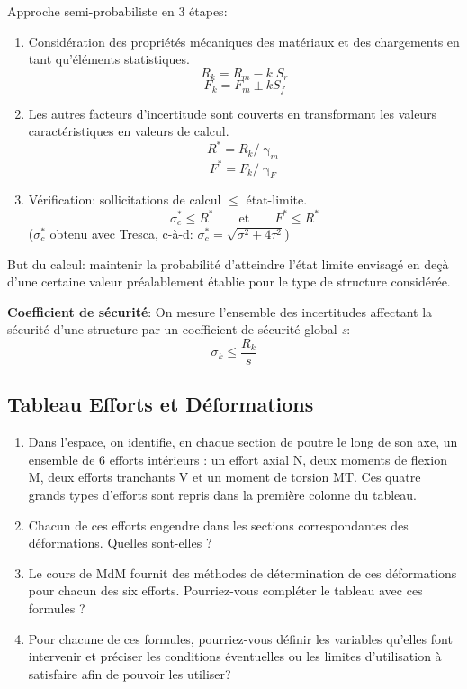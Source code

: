 \documentclass[a4paper]{article}
\begin{document}
Approche semi-probabiliste en 3 étapes:
\begin{enumerate}[label=(\alph*)]

\item Considération des propriétés mécaniques des matériaux et des chargements en tant qu'éléments statistiques.
\[ R_k = R_m - k \; S_r \]
\[ F_k = F_m \pm k S_f \]

\item Les autres facteurs d'incertitude sont couverts en transformant les valeurs caractéristiques en valeurs de calcul.
\[ R^* = R_k / \upgamma_m \]
\[ F^* = F_k / \upgamma_F \]

\item Vérification: sollicitations de calcul $ \leq $ état-limite.
\[ \sigma_c^* \leq R^* \qquad \text{et} \qquad F^* \leq R^* \]
($ \sigma_c^* $ obtenu avec Tresca, c-à-d: $ \sigma_c^* = \sqrt{\sigma^2+4 \tau^2} $)

\end{enumerate}
But du calcul: maintenir la probabilité d'atteindre l'état limite envisagé en deçà d'une certaine valeur préalablement établie pour le type de structure considérée.



\textbf{Coefficient de sécurité}: On mesure l'ensemble des incertitudes affectant la sécurité d'une structure  par un coefficient de sécurité global \emph{s}: 
\[ \sigma_k \leq \frac{R_k}{s} \]





\subsection{Tableau Efforts et Déformations}





\begin{siderules}
\begin{enumerate}[label=(\alph*)]
    \item Dans l’espace, on identifie, en chaque section de poutre le long de son axe, un ensemble de 6 efforts intérieurs : un effort axial N, deux moments de flexion M, deux efforts tranchants V et un moment de torsion MT. Ces quatre grands types d’efforts sont repris dans la première colonne du tableau.
    \item Chacun de ces efforts engendre dans les sections correspondantes des déformations. Quelles sont-elles ?
    \item Le cours de MdM fournit des méthodes de détermination de ces déformations pour chacun des six efforts. Pourriez-vous compléter le tableau avec ces formules ?
    \item Pour chacune de ces formules, pourriez-vous définir les variables qu’elles font intervenir et préciser les conditions éventuelles ou les limites d’utilisation à satisfaire afin de pouvoir les utiliser?
\end{enumerate}
\end{siderules}
\end{document}
